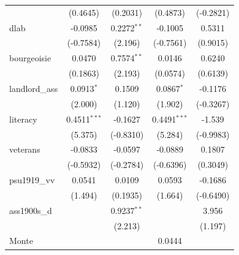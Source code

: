 \begin{table}[htbp]
\begin{tabular}{lcccc}
                                       & (0.4645)               & (0.2031)               & (0.4873)               & (-0.2821)\\   
      dlab                             & -0.0985                & 0.2272$^{**}$          & -0.1005                & 0.5311\\   
                                       & (-0.7584)              & (2.196)                & (-0.7561)              & (0.9015)\\   
      bourgeoisie                      & 0.0470                 & 0.7574$^{**}$          & 0.0146                 & 0.6240\\   
                                       & (0.1863)               & (2.193)                & (0.0574)               & (0.6139)\\   
      landlord\_ass                    & 0.0913$^{*}$           & 0.1509                 & 0.0867$^{*}$           & -0.1176\\   
                                       & (2.000)                & (1.120)                & (1.902)                & (-0.3267)\\   
      literacy                         & 0.4511$^{***}$         & -0.1627                & 0.4491$^{***}$         & -1.539\\   
                                       & (5.375)                & (-0.8310)              & (5.284)                & (-0.9983)\\   
      veterans                         & -0.0833                & -0.0597                & -0.0889                & 0.1807\\   
                                       & (-0.5932)              & (-0.2784)              & (-0.6396)              & (0.3049)\\   
      psu1919\_vv                      & 0.0541                 & 0.0109                 & 0.0593                 & -0.1686\\   
                                       & (1.494)                & (0.1935)               & (1.664)                & (-0.6490)\\   
      ass1900s\_d                      &                        & 0.9237$^{**}$          &                        & 3.956\\   
                                       &                        & (2.213)                &                        & (1.197)\\   
      Monte                            &                        &                        & 0.0444                 &   \\   

\end{tabular}
\end{table}
